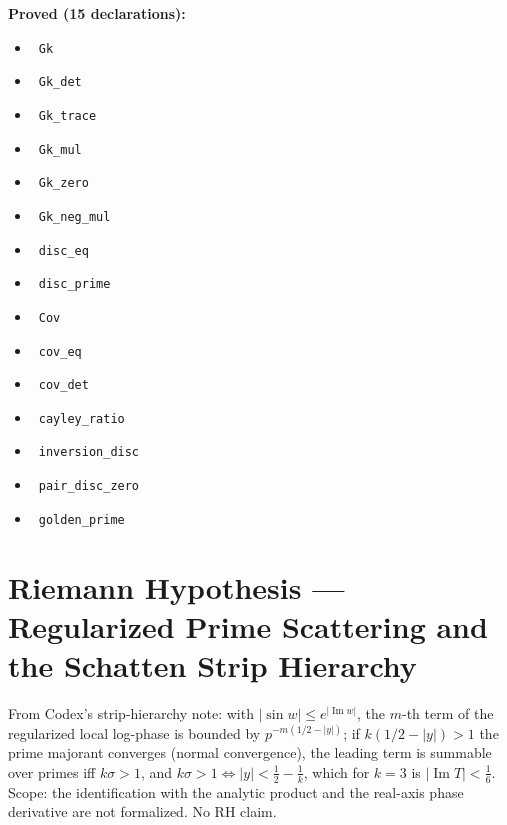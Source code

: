 \documentclass{report}
\theoremstyle{definition}
\begin{document}
\noindent\textbf{Proved (15 declarations):}
\begin{itemize}
  \item {}\leanok\ \texttt{Gk}
  \item {}\leanok\ \texttt{Gk\_det}
  \item {}\leanok\ \texttt{Gk\_trace}
  \item {}\leanok\ \texttt{Gk\_mul}
  \item {}\leanok\ \texttt{Gk\_zero}
  \item {}\leanok\ \texttt{Gk\_neg\_mul}
  \item {}\leanok\ \texttt{disc\_eq}
  \item {}\leanok\ \texttt{disc\_prime}
  \item {}\leanok\ \texttt{Cov}
  \item {}\leanok\ \texttt{cov\_eq}
  \item {}\leanok\ \texttt{cov\_det}
  \item {}\leanok\ \texttt{cayley\_ratio}
  \item {}\leanok\ \texttt{inversion\_disc}
  \item {}\leanok\ \texttt{pair\_disc\_zero}
  \item {}\leanok\ \texttt{golden\_prime}
\end{itemize}

\section{Riemann Hypothesis --- Regularized Prime Scattering and the Schatten Strip Hierarchy}
From Codex's strip-hierarchy note: with $|\sin w|\le e^{|\operatorname{Im}w|}$, the $m$-th term of the regularized local log-phase is bounded by $p^{-m(1/2-|y|)}$; if $k(1/2-|y|)>1$ the prime majorant converges (normal convergence), the leading term is summable over primes iff $k\sigma>1$, and $k\sigma>1\iff|y|<\tfrac12-\tfrac1k$, which for $k=3$ is $|\operatorname{Im}T|<\tfrac16$. Scope: the identification with the analytic product and the real-axis phase derivative are not formalized. No RH claim.
\end{document}
